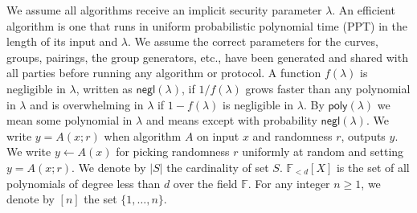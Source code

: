 \noindent We assume all algorithms receive an implicit security parameter $\lambda$. 
An efficient algorithm is one that runs in uniform probabilistic polynomial time (PPT) in the length of its input and $\lambda$. 
We assume the correct parameters for the curves, groups, pairings, the group generators, etc., have been generated and shared with all parties before running any algorithm or protocol. 
A function $f(\lambda)$ is negligible in $\lambda$, written as $\mathsf{negl}(\lambda)$, if $1/f(\lambda)$ grows faster than 
any polynomial in $\lambda$ and is overwhelming in $\lambda$ if $1-f(\lambda)$ is negligible in $\lambda$. By $\mathsf{poly}(\lambda)$ 
we mean some polynomial in $\lambda$ and \ewnp means except with probability $\mathsf{negl}(\lambda)$.
We write $y = A(x; r)$ when algorithm $A$ on input $x$ and randomness $r$, outputs $y$.
We write $y \leftarrow A(x)$ for picking randomness $r$ uniformly at random and setting $y = A(x; r)$. We denote by $|S|$ the cardinality of set $S$. 
$\mathbb{F}_{<d}[X]$ is the set of all polynomials of degree less than $d$ over the field $\mathbb{F}$. For any integer 
$n \geq 1$, we denote by $[n]$ the set $\{1, \ldots, n\}$.
\vspace{-0.015in}
